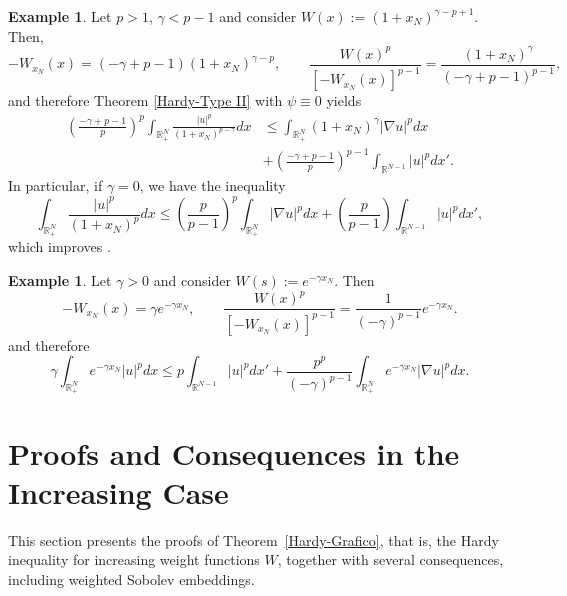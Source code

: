 \documentclass[12pt]{amsart}
\theoremstyle{definition}
\newtheorem{example}[theorem]{Example}
\theoremstyle{plain}
\begin{document}
	\begin{example}\label{Example-Decreassing}
        Let  $p>1$, $\gamma<p-1$ and consider
		$W(x):=(1+x_N)^{\gamma-p+1}$. Then,
		$$
		-W_{x_N}(x)=(-\gamma+p-1)(1+x_N)^{\gamma-p}, \qquad
		\frac{W(x)^p}{[-W_{x_N}(x)]^{p-1}}=\frac{(1+x_N)^\gamma}{(-\gamma+p-1)^{p-1}},
		$$
		and therefore Theorem \ref{Hardy-Type II} with $\psi\equiv 0$ yields 
      	$$
			\begin{aligned}
				\left(\frac{-\gamma+p-1}{p}\right)^{p}\int_{\mathbb{R}^N_+} \frac{|u|^p}{(1+x_N)^{p-\gamma}}dx&\leq \int_{\mathbb{R}^{N}_+}(1+x_N)^\gamma|\nabla u|^pdx
                \\
				&+ \left(\frac{-\gamma+p-1}{p}\right)^{p-1}	\int_{\mathbb{R}^{N-1}} |u|^{p}dx'.
			\end{aligned}
		$$
    In particular, if $\gamma=0$, we have the inequality 
        $$
		\int_{\mathbb{R}^N_+} \frac{|u|^p}{(1+x_N)^{p}}dx\leq \left(\frac{p}{p-1}\right)^p\int_{\mathbb{R}^N_+} |\nabla u|^pdx + \left( \frac{p}{p-1} \right) \int_{\mathbb{R}^{N-1}} |u|^{p}dx',
		$$
        which improves \cite[Theorem~1.1]{Abreu-Felix-Medeiros}. 
   \end{example}

   \begin{example}  Let $\gamma>0$ and consider
		$W(s):=e^{-\gamma x_N}$. Then
		$$
		-W_{x_N}(x)=\gamma e^{-\gamma x_N}, \qquad \frac{W(x)^p}{[-W_{x_N}(x)]^{p-1}} =\frac{1}{(-\gamma)^{p-1}}e^{-\gamma x_N}.
		$$
		and therefore
		$$
			\gamma\int_{\mathbb{R}^N_+} e^{-\gamma x_N}|u|^pdx \leq p\int_{\mathbb{R}^{N-1}} |u|^{p}dx' + \frac{p^p}{(-\gamma)^{p-1}}\int_{\mathbb{R}^{N}_+}e^{-\gamma x_N}|\nabla u|^pdx.
		$$
\end{example}

\section{Proofs and Consequences in the Increasing Case} \label{sec:inc_weight_proofs}

This section presents the proofs of Theorem~\ref{Hardy-Grafico}, that is, the Hardy inequality for increasing weight functions $W$, together with several consequences, including weighted Sobolev embeddings.
\end{document}
